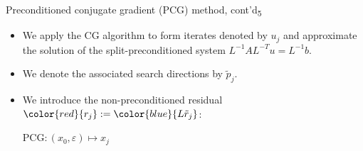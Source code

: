 \documentclass[t,usepdftitle=false]{beamer}
\begin{document}
\begin{frame}{Preconditioned conjugate gradient (PCG) method, cont'd\textsubscript{5}}
\begin{itemize}
\item We apply the CG algorithm to form iterates denoted by $u_j$ and approximate the solution of the split-preconditioned system $L^{-1}AL^{-T}u=L^{-1}b$.
\item[] We denote the associated search directions by $\tilde{p}_j$.
\item[] We introduce the non-preconditioned residual ${\color{red}{r_j}}:={\color{blue}{L\tilde{r}_j}}$:
\vspace{-.25cm}
\setcounter{algorithm}{3}
\begin{algorithm}[H]
\small
\caption{PCG$:(x_0,\varepsilon)\mapsto x_j$}
\begin{algorithmic}[1]
\ENDFOR
\end{algorithmic}
\end{algorithm}
\end{itemize}
\end{frame}
\setcounter{framenumber}{8}
\end{document}
